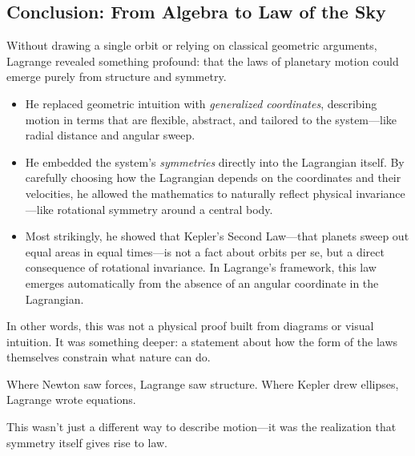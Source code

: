 \subsection{Conclusion: From Algebra to Law of the Sky}

Without drawing a single orbit or relying on classical geometric arguments, Lagrange revealed something profound: that the laws of planetary motion could emerge purely from structure and symmetry.

\begin{itemize}
    \item He replaced geometric intuition with \textit{generalized coordinates}, describing motion in terms that are flexible, abstract, and tailored to the system—like radial distance and angular sweep.
    
    \item He embedded the system’s \textit{symmetries} directly into the Lagrangian itself. By carefully choosing how the Lagrangian depends on the coordinates and their velocities, he allowed the mathematics to naturally reflect physical invariance—like rotational symmetry around a central body.
    
    \item Most strikingly, he showed that Kepler’s Second Law—that planets sweep out equal areas in equal times—is not a fact about orbits per se, but a direct consequence of rotational invariance. In Lagrange's framework, this law emerges automatically from the absence of an angular coordinate in the Lagrangian.
\end{itemize}

In other words, this was not a physical proof built from diagrams or visual intuition. It was something deeper: a statement about how the form of the laws themselves constrain what nature can do.

Where Newton saw forces, Lagrange saw structure. Where Kepler drew ellipses, Lagrange wrote equations.

This wasn’t just a different way to describe motion—it was the realization that symmetry itself gives rise to law.



